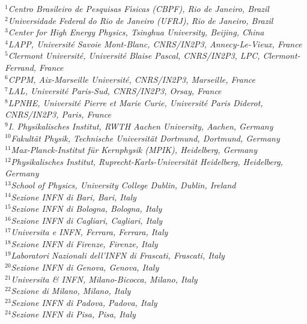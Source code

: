 \documentclass[12pt,a4paper]{article}
\begin{document}
\begin{flushleft}
{\footnotesize \it
$ ^{1}$Centro Brasileiro de Pesquisas F{\'\i}sicas (CBPF), Rio de Janeiro, Brazil\\
$ ^{2}$Universidade Federal do Rio de Janeiro (UFRJ), Rio de Janeiro, Brazil\\
$ ^{3}$Center for High Energy Physics, Tsinghua University, Beijing, China\\
$ ^{4}$LAPP, Universit{\'e} Savoie Mont-Blanc, CNRS/IN2P3, Annecy-Le-Vieux, France\\
$ ^{5}$Clermont Universit{\'e}, Universit{\'e} Blaise Pascal, CNRS/IN2P3, LPC, Clermont-Ferrand, France\\
$ ^{6}$CPPM, Aix-Marseille Universit{\'e}, CNRS/IN2P3, Marseille, France\\
$ ^{7}$LAL, Universit{\'e} Paris-Sud, CNRS/IN2P3, Orsay, France\\
$ ^{8}$LPNHE, Universit{\'e} Pierre et Marie Curie, Universit{\'e} Paris Diderot, CNRS/IN2P3, Paris, France\\
$ ^{9}$I. Physikalisches Institut, RWTH Aachen University, Aachen, Germany\\
$ ^{10}$Fakult{\"a}t Physik, Technische Universit{\"a}t Dortmund, Dortmund, Germany\\
$ ^{11}$Max-Planck-Institut f{\"u}r Kernphysik (MPIK), Heidelberg, Germany\\
$ ^{12}$Physikalisches Institut, Ruprecht-Karls-Universit{\"a}t Heidelberg, Heidelberg, Germany\\
$ ^{13}$School of Physics, University College Dublin, Dublin, Ireland\\
$ ^{14}$Sezione INFN di Bari, Bari, Italy\\
$ ^{15}$Sezione INFN di Bologna, Bologna, Italy\\
$ ^{16}$Sezione INFN di Cagliari, Cagliari, Italy\\
$ ^{17}$Universita e INFN, Ferrara, Ferrara, Italy\\
$ ^{18}$Sezione INFN di Firenze, Firenze, Italy\\
$ ^{19}$Laboratori Nazionali dell'INFN di Frascati, Frascati, Italy\\
$ ^{20}$Sezione INFN di Genova, Genova, Italy\\
$ ^{21}$Universita {\&} INFN, Milano-Bicocca, Milano, Italy\\
$ ^{22}$Sezione di Milano, Milano, Italy\\
$ ^{23}$Sezione INFN di Padova, Padova, Italy\\
$ ^{24}$Sezione INFN di Pisa, Pisa, Italy\\
}
\end{flushleft}
\end{document}
